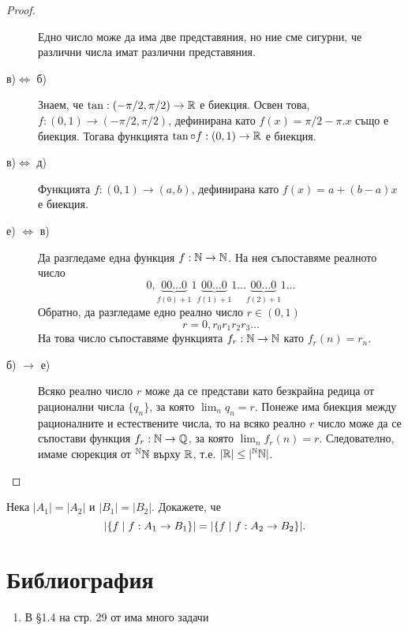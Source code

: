 \begin{proof}
\begin{description}
    Едно число може да има две представяния, но ние сме сигурни, че различни числа имат различни представяния.
  \item[в)$\iff$ б)]
    Знаем, че $\tan: (-\pi/2,\pi/2) \to \mathbb{R}$ е биекция.
    Освен това, $f: (0,1) \to (-\pi/2,\pi/2)$, дефинирана като
    $f(x) = \pi/2 - \pi.x$ също е биекция.
    Тогава функцията $\tan\circ f : (0,1) \to \mathbb{R}$ е биекция.
  \item[в)$\iff$ д)]
    Функцията $f: (0,1) \to (a,b)$,
    дефинирана като $f(x) = a + (b-a)x$ е биекция.
  \item[е) $\iff$ в)]
    Да разгледаме една функция $f:\mathbb{N}\to\mathbb{N}$.
    На нея съпоставяме реалното число
    \[0,\underbrace{00\dots 0}_{f(0)+1}1\underbrace{00\dots 0}_{f(1)+1}1\dots\underbrace{00\dots 0}_{f(2)+1}1\dots\]
    Обратно, да разгледаме едно реално число $r\in (0,1)$
    \[r = 0, r_0r_1r_2r_3\dots\]
    На това число съпоставяме функцията $f_r:\mathbb{N}\to\mathbb{N}$ като $f_r(n) = r_n$.
  \item[б) $\rightarrow$ е)]
    Всяко реално число $r$ може да се представи като безкрайна редица от рационални числа $\{q_n\}$,
    за която $\lim_n q_n = r$.
    Понеже има биекция между рационалните и естествените числа, то на всяко реално $r$ число може да се съпостави
    функция $f_r:\mathbb{N}\to \mathbb{Q}$, за която $\lim_n f_r(n) = r$.
    Следователно, имаме сюрекция от $^{\mathbb{N}}\mathbb{N}$ върху $\mathbb{R}$, т.е. $\lvert{\mathbb{R}}\rvert \leq \lvert{^{\mathbb{N}}\mathbb{N}}\rvert$.
  \end{description}
\end{proof}

\begin{problem}
  Нека $|A_1| = |A_2|$ и $|B_1| = |B_2|$.
  Докажете, че \[\lvert{\{f\mid f:A_1\to B_1\}}\rvert = \lvert{\{f\mid f:A_2\to B_2\}}\rvert.\]
\end{problem}

\section*{Библиография}
\begin{enumerate}[]
\item 
  В §1.4 на стр. 29 от \cite{lavrov-maksimova} има много задачи
\end{enumerate}

